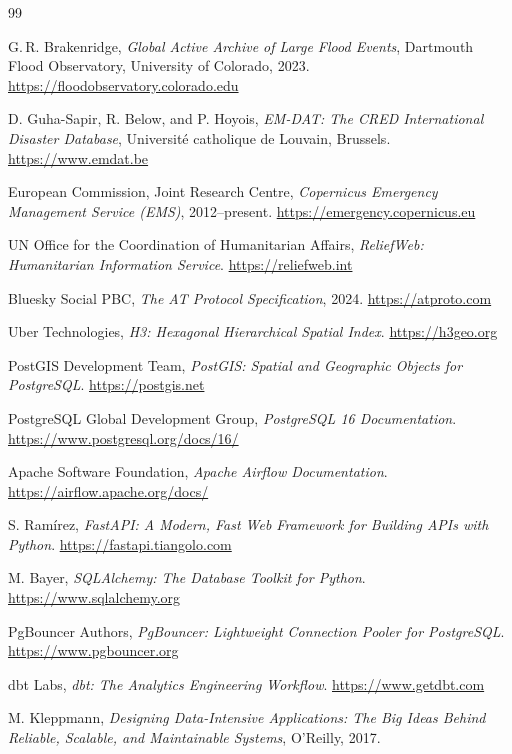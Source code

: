 \documentclass[11pt,a4paper]{article}
\begin{document}
\newpage

\begin{thebibliography}{99}

G.\,R. Brakenridge, \emph{Global Active Archive of Large Flood Events},
Dartmouth Flood Observatory, University of Colorado, 2023.
\url{https://floodobservatory.colorado.edu}

D. Guha-Sapir, R. Below, and P. Hoyois, \emph{EM-DAT: The CRED International
Disaster Database}, Universit\'e catholique de Louvain, Brussels.
\url{https://www.emdat.be}

European Commission, Joint Research Centre, \emph{Copernicus Emergency
Management Service (EMS)}, 2012--present.
\url{https://emergency.copernicus.eu}

UN Office for the Coordination of Humanitarian Affairs, \emph{ReliefWeb:
Humanitarian Information Service}.
\url{https://reliefweb.int}

Bluesky Social PBC, \emph{The AT Protocol Specification}, 2024.
\url{https://atproto.com}

Uber Technologies, \emph{H3: Hexagonal Hierarchical Spatial Index}.
\url{https://h3geo.org}

PostGIS Development Team, \emph{PostGIS: Spatial and Geographic Objects for
PostgreSQL}. \url{https://postgis.net}

PostgreSQL Global Development Group, \emph{PostgreSQL 16 Documentation}.
\url{https://www.postgresql.org/docs/16/}

Apache Software Foundation, \emph{Apache Airflow Documentation}.
\url{https://airflow.apache.org/docs/}

S. Ram\'irez, \emph{FastAPI: A Modern, Fast Web Framework for Building APIs
with Python}. \url{https://fastapi.tiangolo.com}

M. Bayer, \emph{SQLAlchemy: The Database Toolkit for Python}.
\url{https://www.sqlalchemy.org}

PgBouncer Authors, \emph{PgBouncer: Lightweight Connection Pooler for
PostgreSQL}. \url{https://www.pgbouncer.org}

dbt Labs, \emph{dbt: The Analytics Engineering Workflow}.
\url{https://www.getdbt.com}

M. Kleppmann, \emph{Designing Data-Intensive Applications: The Big Ideas
Behind Reliable, Scalable, and Maintainable Systems}, O'Reilly, 2017.


\end{thebibliography}
\end{document}
